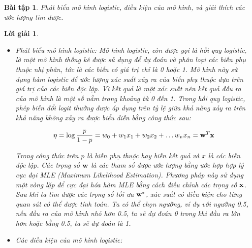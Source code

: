 \documentclass[14pt, a4paper]{article}
\theoremstyle{sltheorem}
\newtheorem{baitap}{Bài tập}
\theoremstyle{soltheorem}
\newtheorem*{loigiai}{Lời giải}
\begin{document}
\begin{baitap}
    Phát biểu mô hình logistic, điều kiện của mô hình, và giải thích các ước lượng tìm được.
\end{baitap}

\begin{loigiai}
    \begin{itemize}
        \item Phát biểu mô hình logistic:
        Mô hình logistic, còn được gọi là hồi quy logistic, là một mô hình thống kê được sử dụng để dự đoán và phân loại các biến phụ thuộc nhị phân, tức là các biến có giá trị chỉ là 0 hoặc 1. 
        Mô hình này sử dụng hàm logistic để ước lượng xác suất xảy ra của biến phụ thuộc dựa trên giá trị của các biến độc lập.
        Vì kết quả là một xác suất nên kết quả đầu ra của mô hình là một số nằm trong khoảng từ 0 đến 1.
        Trong hồi quy logistic, phép biến đổi logit thường được áp dụng trên tỷ lệ giữa khả năng xảy ra trên khả năng không xảy ra được biểu diễn bằng công thức sau:

        \begin{equation*}
            \eta = \log \dfrac{p}{1-p} = w_0 +  w_1 x_1 + w_2 x_2 + \dots w_n x_n = \bold{w}^T \bold{x}
        \end{equation*}

        Trong công thức trên $p$ là biến phụ thuộc hay biến kết quả và $x$ là các biến độc lập.
        Các trọng số $\bold{w}$ là các tham số được ước lượng bằng ước hợp hợp lý cực đại MLE (Maximum Likelihood Estimation).
        Phương pháp này sử dụng một vòng lặp để cực đại hóa hàm MLE bằng cách điều chỉnh các trọng số $\bold{x}$.
        Sau khi ta tìm được các trọng số tối ưu $\bold{w}^*$, xác suất có điều kiện cho từng quan sát có thể được tính toán.
        Ta có thể chọn ngưỡng, ví dụ với ngưỡng 0.5, nếu đầu ra của mô hình nhỏ hơn 0.5, ta sẽ dự đoán 0 trong khi đầu ra lớn hơn hoặc bằng 0.5, ta sẽ dự đoán là 1.

        \item Các điều kiện của mô hình logistic:
        

\end{itemize}
\end{loigiai}
\end{document}
